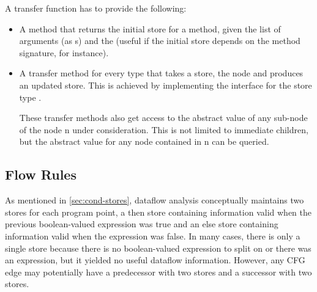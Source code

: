 A transfer function has to provide the following:
\begin{itemize}
\item A method that returns the initial store for a method, given
the list of arguments (as s)
and the  (useful if the initial store depends on the method signature, for instance).

\item A transfer method for every  type that takes a store, the node and produces
an updated store. This is achieved by implementing the  interface
for the store type .

These transfer methods also get access to the abstract value of any sub-node of the node \code n
under consideration.  This is not limited to immediate children, but the abstract value for any node contained
in \code n can be queried.

\end{itemize}


\subsection{Flow Rules}
\label{sec:flow-rules}

As mentioned in \autoref{sec:cond-stores}, dataflow analysis conceptually maintains two stores for each program point, a then store containing information valid when the previous boolean-valued expression was true and an else store containing information valid when the expression was false.  In many cases, there is only a single store because there is no boolean-valued expression to split on or there was an expression, but it yielded no useful dataflow information.  However, any CFG edge may potentially have a predecessor with two stores and a successor with two stores.

